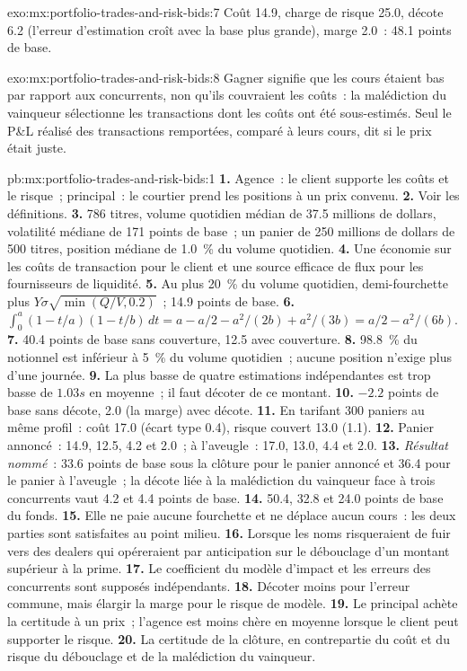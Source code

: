 \begin{solution}{exo:mx:portfolio-trades-and-risk-bids:7}
Coût 14.9, charge de risque 25.0, décote 6.2 (l'erreur d'estimation croît avec la base plus grande), marge 2.0~: 48.1 points de base.
\end{solution}

\begin{solution}{exo:mx:portfolio-trades-and-risk-bids:8}
Gagner signifie que les cours étaient bas par rapport aux concurrents, non qu'ils couvraient les coûts~: la malédiction du vainqueur sélectionne les transactions dont les coûts
ont été sous-estimés. Seul le P\&L réalisé des transactions remportées, comparé à leurs cours, dit si le prix était juste.
\end{solution}

\begin{solution}{pb:mx:portfolio-trades-and-risk-bids:1}
\textbf{1.} Agence~: le client supporte les coûts et le risque~; principal~: le courtier prend les positions à un prix convenu.
\textbf{2.} Voir les définitions.
\textbf{3.} 786 titres, volume quotidien médian de 37.5 millions de dollars, volatilité médiane de 171 points de base~; un panier de 250 millions de dollars de 500 titres, position médiane
de 1.0~\% du volume quotidien.
\textbf{4.} Une économie sur les coûts de transaction pour le client et une source efficace de flux pour les fournisseurs de liquidité.
\textbf{5.} Au plus 20~\% du volume quotidien, demi-fourchette plus $Y\sigma\sqrt{\min(Q/V,0.2)}$~; 14.9 points de base.
\textbf{6.} $\int_0^a(1-t/a)(1-t/b)\,dt=a-a/2-a^2/(2b)+a^2/(3b)=a/2-a^2/(6b)$.
\textbf{7.} 40.4 points de base sans couverture, 12.5 avec couverture.
\textbf{8.} 98.8~\% du notionnel est inférieur à 5~\% du volume quotidien~; aucune position n'exige plus d'une journée.
\textbf{9.} La plus basse de quatre estimations indépendantes est trop basse de $1.03s$ en moyenne~; il faut décoter de ce montant.
\textbf{10.} $-2.2$ points de base sans décote, 2.0 (la marge) avec décote.
\textbf{11.} En tarifant 300 paniers au même profil~: coût 17.0 (écart type 0.4), risque couvert 13.0 (1.1).
\textbf{12.} Panier annoncé~: 14.9, 12.5, 4.2 et 2.0~; à l'aveugle~: 17.0, 13.0, 4.4 et 2.0.
\textbf{13.} \emph{Résultat nommé}~: 33.6 points de base sous la clôture pour le panier annoncé et 36.4 pour le panier à l'aveugle~; la décote
liée à la malédiction du vainqueur face à trois concurrents vaut 4.2 et 4.4 points de base.
\textbf{14.} 50.4, 32.8 et 24.0 points de base du fonds.
\textbf{15.} Elle ne paie aucune fourchette et ne déplace aucun cours~: les deux parties sont satisfaites au point milieu.
\textbf{16.} Lorsque les noms risqueraient de fuir vers des dealers qui opéreraient par anticipation sur le débouclage d'un montant supérieur à la prime.
\textbf{17.} Le coefficient du modèle d'impact et les erreurs des concurrents sont supposés indépendants.
\textbf{18.} Décoter moins pour l'erreur commune, mais élargir la marge pour le risque de modèle.
\textbf{19.} Le principal achète la certitude à un prix~; l'agence est moins chère en moyenne lorsque le client peut supporter le risque.
\textbf{20.} La certitude de la clôture, en contrepartie du coût et du risque du débouclage et de la malédiction du vainqueur.
\end{solution}

